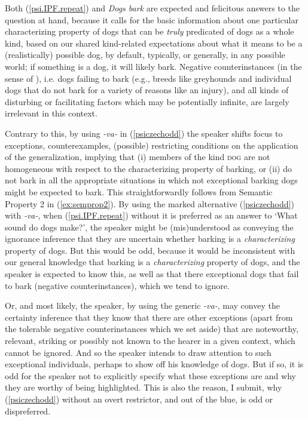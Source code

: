 \documentclass[output=paper,colorlinks,citecolor=brown]{langscibook}
\begin{document}
Both (\ref{psi.IPF.repeat}) and \textit{Dogs bark} are
expected and felicitous answers to the question
at hand, because it calls for the basic information about one particular characterizing property of dogs that can be \textit{truly} predicated of dogs as a whole kind, based on our shared kind-related expectations about what it means to be a (realistically) possible dog, by default, typically, or generally, in any possible world; if something is a dog, it will likely bark. Negative counterinstances (in the sense of \citealt{leslie2008}), i.e. dogs failing to bark
(e.g., breeds like greyhounds and individual dogs that do not bark for a variety of reasons like an injury), and all kinds of disturbing or facilitating factors which may be potentially infinite, are largely irrelevant in this context.

Contrary to this, by using \textit{-va-} in (\ref{psiczechodd}) the speaker shifts focus to exceptions, counterexamples, (possible)
restricting conditions on the application of the generalization, implying that (i) members of the kind \textsc{dog} are not homogeneous with respect to the characterizing property of barking, or (ii) do not bark in all the appropriate situations in which not exceptional barking dogs might be expected to bark.
This straightforwardly follows from Semantic Property 2 in (\ref{ex:semprop2}).
By using the marked alternative (\ref{psiczechodd}) with \textit{-va-}, when (\ref{psi.IPF.repeat}) without it is preferred as an answer to `What sound do dogs make?',
the speaker might be (mis)understood as conveying the ignorance inference that they are uncertain whether barking is a \textit{characterizing} property of dogs. But this would be odd, because it would be inconsistent with our general knowledge that barking is a  \textit{characterizing} property of dogs, and the speaker is expected to know this, as well as that
there exceptional dogs that fail to bark (negative counterinstances), which we tend to ignore.

Or, and
most likely, the speaker, by using the generic \textit{-va-}, may  convey the certainty inference that they know that there are other exceptions (apart from the tolerable negative counterinstances which we set aside) that are noteworthy, relevant, striking or possibly not known to the hearer in a given context, which cannot be ignored. And so the speaker intends to draw attention to such exceptional individuals, perhaps to show off his knowledge of dogs. But if so, it is odd for the speaker not to explicitly specify what these exceptions are and why they are worthy of being highlighted. This is also the reason, I submit, why (\ref{psiczechodd}) without an overt restrictor, and out of the blue, is odd or dispreferred.
\end{document}
